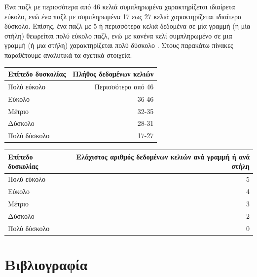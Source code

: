 \documentclass[12pt]{book}
\theoremstyle{definition}
\begin{document}
Ένα παζλ με περισσότερα από 46 κελιά συμπληρωμένα χαρακτηρίζεται ιδιαίρετα εύκολο, ενώ ένα παζλ με συμπληρωμένα 17 εως 27 κελιά χαρακτηρίζεται ιδιαίτερα δύσκολο. Επίσης, ένα παζλ με 5 ή περισσότερα κελιά δεδομένα σε μία γραμμή (ή μία στήλη) θεωρείται πολύ εύκολο παζλ, ενώ με κανένα κελί συμπληρωμένο σε μια γραμμή (ή μια στήλη) χαρακτηρίζεται πολύ δύσκολο \cite{10}. Στους παρακάτω πίνακες παραθέτουμε αναλυτικά τα σχετικά στοιχεία. \par  

\begin{center}
	\begin{tabular}{ | l | r | }
		\hline
		Επίπεδο δυσκολίας & Πλήθος δεδομένων κελιών \\ 
 
		\hline
		Πολύ εύκολο & Περισσότερα από 46  \\
		\hline  
		Εύκολο & 36-46  \\
		\hline 
		Μέτριο & 32-35  \\
		\hline 
		Δύσκολο & 28-31  \\
		\hline 
		Πολύ δύσκολο & 17-27  \\
		\hline 
	\end{tabular}
\end{center}

\begin{center}
	\begin{tabular}{ | l | r | }
		\hline
		Επίπεδο δυσκολίας & Ελάχιστος αριθμός δεδομένων κελιών ανά γραμμή ή ανά στήλη \\ 
 
		\hline
		Πολύ εύκολο & 5  \\
		\hline  
		Εύκολο & 4  \\
		\hline 
		Μέτριο & 3  \\
		\hline 
		Δύσκολο & 2  \\
		\hline 
		Πολύ δύσκολο & 0  \\
		\hline 
	\end{tabular}
\end{center}



 
\chapter{Βιβλιογραφία}
\end{document}

